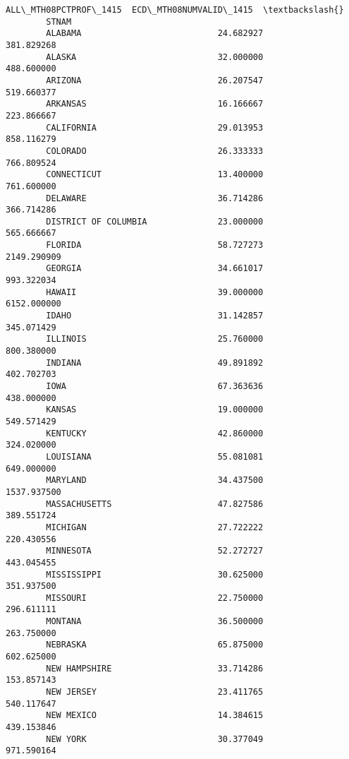 \documentclass[11pt]{article}
\begin{document}
\begin{Verbatim}[commandchars=\\\{\}]
                              ALL\_MTH08PCTPROF\_1415  ECD\_MTH08NUMVALID\_1415  \textbackslash{}
        STNAM                                                                 
        ALABAMA                           24.682927              381.829268   
        ALASKA                            32.000000              488.600000   
        ARIZONA                           26.207547              519.660377   
        ARKANSAS                          16.166667              223.866667   
        CALIFORNIA                        29.013953              858.116279   
        COLORADO                          26.333333              766.809524   
        CONNECTICUT                       13.400000              761.600000   
        DELAWARE                          36.714286              366.714286   
        DISTRICT OF COLUMBIA              23.000000              565.666667   
        FLORIDA                           58.727273             2149.290909   
        GEORGIA                           34.661017              993.322034   
        HAWAII                            39.000000             6152.000000   
        IDAHO                             31.142857              345.071429   
        ILLINOIS                          25.760000              800.380000   
        INDIANA                           49.891892              402.702703   
        IOWA                              67.363636              438.000000   
        KANSAS                            19.000000              549.571429   
        KENTUCKY                          42.860000              324.020000   
        LOUISIANA                         55.081081              649.000000   
        MARYLAND                          34.437500             1537.937500   
        MASSACHUSETTS                     47.827586              389.551724   
        MICHIGAN                          27.722222              220.430556   
        MINNESOTA                         52.272727              443.045455   
        MISSISSIPPI                       30.625000              351.937500   
        MISSOURI                          22.750000              296.611111   
        MONTANA                           36.500000              263.750000   
        NEBRASKA                          65.875000              602.625000   
        NEW HAMPSHIRE                     33.714286              153.857143   
        NEW JERSEY                        23.411765              540.117647   
        NEW MEXICO                        14.384615              439.153846   
        NEW YORK                          30.377049              971.590164   

\end{Verbatim}
\end{document}
